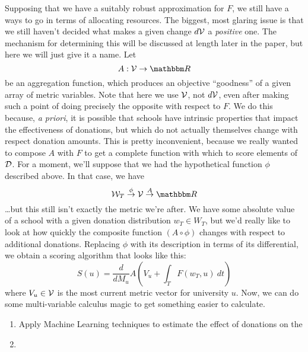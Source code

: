\documentclass[paper.tex]{subfiles}
\begin{document}
	Supposing that we have a suitably robust approximation for $F$, we still have a ways to go in terms of allocating resources. The biggest, most glaring issue is that we still haven't decided what makes a given change $d\mathcal{V}$ a \emph{positive} one. The mechanism for determining this will be discussed at length later in the paper, but here we will just give it a name. Let
	\begin{equation}
		A : \V \to \Re
	\end{equation}
	be an aggregation function, which produces an objective ``goodness'' of a given array of metric variables. Note that here we use $\mathcal{V}$, not $d\mathcal{V}$, even after making such a point of doing precisely the opposite with respect to $F$. We do this because, \emph{a priori}, it is possible that schools have intrinsic properties that impact the effectiveness of donations, but which do not actually themselves change with respect donation amounts. This is pretty inconvenient, because we really wanted to compose $A$ with $F$ to get a complete function with which to score elements of $\mathcal{D}$. For a moment, we'll suppose that we had the hypothetical function $\phi$ described above. In that case, we have
	\[ \W_T \overset{\phi}{\to} \V \overset{A}{\to} \Re \] 
	\ldots but this still isn't exactly the metric we're after. We have some absolute value of a school with a given donation distribution $w_T \in W_T$, but we'd really like to look at how quickly the composite function $(A \circ \phi)$ changes with respect to additional donations. Replacing $\phi$ with its description in terms of its differential, we obtain a scoring algorithm that looks like this:
	\begin{equation}
		S(u) =  \frac{d}{dM_u} A\left(V_u + \int_{T} F(w_T, u)~dt\right)
	\end{equation}
	where $V_u \in \mathcal{V}$ is the most current metric vector for university $u$. Now, we can do some multi-variable calculus magic to get something easier to calculate.

	\begin{enumerate}
		\item Apply Machine Learning techniques to estimate the effect of donations on the 
		\item 
	\end{enumerate}
	
	
\end{document}
